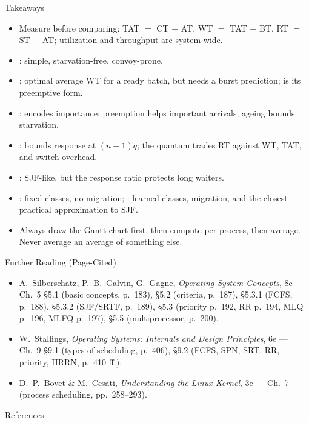 \documentclass[aspectratio=169]{beamer}
\begin{document}
\begin{frame}{Takeaways}
  \begin{itemize}
    \item Measure before comparing: TAT $=$ CT $-$ AT, WT $=$ TAT $-$ BT,
      RT $=$ ST $-$ AT; utilization and throughput are system-wide.
    \item {}: simple, starvation-free, convoy-prone.
    \item {}: optimal average WT for a ready batch, but needs a burst
      prediction;  is its preemptive form.
    \item {}: encodes importance; preemption helps important
      arrivals; ageing bounds starvation.
    \item {}: bounds response at $(n-1)q$; the quantum trades RT
      against WT, TAT, and switch overhead.
    \item {}: SJF-like, but the response ratio protects long waiters.
    \item {}: fixed classes, no migration; : learned
      classes, migration, and the closest practical approximation to SJF.
    \item Always draw the Gantt chart first, then compute per process, then
      average. Never average an average of something else.
  \end{itemize}
\end{frame}

\begin{frame}{Further Reading (Page-Cited)}
  \footnotesize
  \begin{itemize}
    \item A.~Silberschatz, P.~B.~Galvin, G.~Gagne, \emph{Operating System
      Concepts}, 8e --- Ch.~5 \S5.1 (basic concepts, p.~183), \S5.2
      (criteria, p.~187), \S5.3.1 (FCFS, p.~188), \S5.3.2 (SJF/SRTF,
      p.~189), \S5.3 (priority p.~192, RR p.~194, MLQ p.~196, MLFQ p.~197),
      \S5.5 (multiprocessor, p.~200).
    \item W.~Stallings, \emph{Operating Systems: Internals and Design
      Principles}, 6e --- Ch.~9 \S9.1 (types of scheduling, p.~406), \S9.2
      (FCFS, SPN, SRT, RR, priority, HRRN, p.~410 ff.).
    \item D.~P.~Bovet \& M.~Cesati, \emph{Understanding the Linux Kernel},
      3e --- Ch.~7 (process scheduling, pp.~258--293).
  \end{itemize}
  \vspace{0.2cm}
\end{frame}

\begin{frame}[allowframebreaks]{References}
  \footnotesize
  
  \nocite{SilberschatzOSC_operating_system_concepts,
    StallingsOS_internals_design_principles,
    BovetCesati_understanding_linux_kernel}
  
\end{frame}
\end{document}
